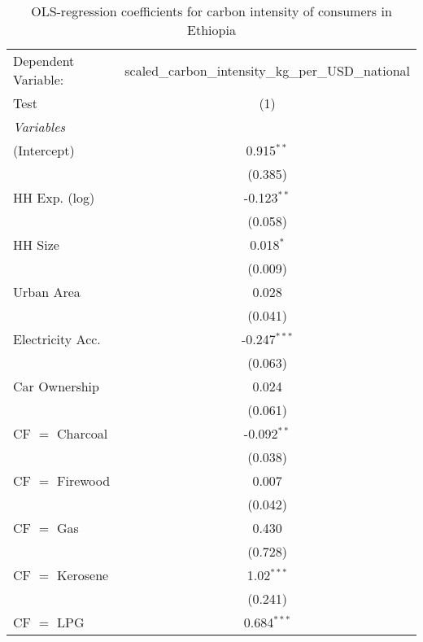 
\begin{table}[htbp!]
   \centering
   \small
   \begin{adjustbox}{width = 1\textwidth, max height = 0.95\textheight, center}
      \begin{threeparttable}[b]
         \caption{\label{tab:OLS_1_ETH} OLS-regression coefficients for carbon intensity of consumers in Ethiopia}
         \begin{tabular}{lc}
            \tabularnewline \midrule \midrule
            Dependent Variable: & scaled\_carbon\_intensity\_kg\_per\_USD\_national\\        
            Test                & (1)\\  
            \midrule
            \emph{Variables}\\
            (Intercept)         & 0.915$^{**}$\\   
                                & (0.385)\\   
            HH Exp. (log)       & -0.123$^{**}$\\   
                                & (0.058)\\   
            HH Size             & 0.018$^{*}$\\   
                                & (0.009)\\   
            Urban Area          & 0.028\\   
                                & (0.041)\\   
            Electricity Acc.    & -0.247$^{***}$\\   
                                & (0.063)\\   
            Car Ownership       & 0.024\\   
                                & (0.061)\\   
            CF $=$ Charcoal     & -0.092$^{**}$\\   
                                & (0.038)\\   
            CF $=$ Firewood     & 0.007\\   
                                & (0.042)\\   
            CF $=$ Gas          & 0.430\\   
                                & (0.728)\\   
            CF $=$ Kerosene     & 1.02$^{***}$\\   
                                & (0.241)\\   
            CF $=$ LPG          & 0.684$^{***}$\\   

\end{tabular}
\end{threeparttable}
\end{adjustbox}
\end{table}
